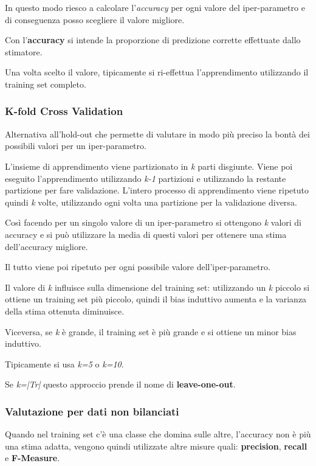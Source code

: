 In questo modo riesco a calcolare l'\emph{accuracy} per ogni valore del
iper-parametro e di conseguenza posso scegliere il valore migliore.

Con l'\textbf{accuracy} si intende la proporzione di predizione corrette
effettuate dallo stimatore.

Una volta scelto il valore, tipicamente si ri-effettua l'apprendimento
utilizzando il training set completo.

\subsubsection{K-fold Cross Validation}\label{k-fold-cross-validation}

Alternativa all'hold-out che permette di valutare in modo più preciso la
bontà dei possibili valori per un iper-parametro.

L'insieme di apprendimento viene partizionato in \emph{k} parti
disgiunte. Viene poi eseguito l'apprendimento utilizzando \emph{k-1}
partizioni e utilizzando la restante partizione per fare validazione.
L'intero processo di apprendimento viene ripetuto quindi \emph{k} volte,
utilizzando ogni volta una partizione per la validazione diversa.

Così facendo per un singolo valore di un iper-parametro si ottengono
\emph{k} valori di accuracy e si può utilizzare la media di questi valori
per ottenere una stima dell'accuracy migliore.

Il tutto viene poi ripetuto per ogni possibile valore
dell'iper-parametro.

Il valore di \emph{k} influisce sulla dimensione del training set:
utilizzando un \emph{k} piccolo si ottiene un training set più piccolo,
quindi il bias induttivo aumenta e la varianza della stima ottenuta
diminuisce.

Viceversa, se \emph{k} è grande, il training set è più grande e si
ottiene un minor bias induttivo.

Tipicamente si usa \emph{k=5} o \emph{k=10}.

Se \textit{k=|Tr|} questo approccio prende il nome di \textbf{leave-one-out}.

\subsubsection{Valutazione per dati non bilanciati}\label{valutazione-per-dati-non-bilanciati}

Quando nel training set c'è una classe che domina sulle altre,
l'accuracy non è più una stima adatta, vengono quindi utilizzate altre
misure quali: \textbf{precision}, \textbf{recall} e \textbf{F-Measure}.

